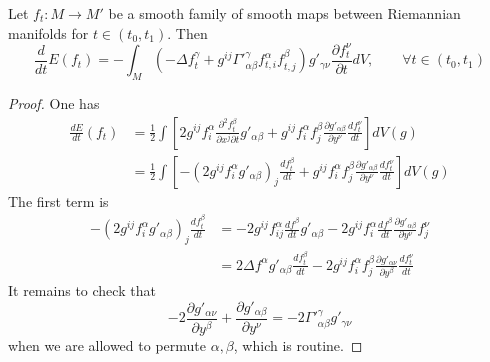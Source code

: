 \begin{lemma}
\label{lem:var-energy}
Let \(f_t: M \longrightarrow M'\) be a smooth family of smooth maps between Riemannian
manifolds for \(t\in (t_0,t_1)\). Then
\[
\frac{d}{dt}E(f_t) = -\int_M \left(-\Delta f_t^\gamma +g^{ij}\Gamma'^{\gamma}_{\alpha\beta}
f^{\alpha}_{t,i}f^{\beta}_{t,j}\right) g'_{\gamma\nu} \frac{\partial f_t^\nu}{\partial
t}dV,\qquad \forall t\in (t_0,t_1)
\]
\end{lemma}
\begin{proof}
One has 
\begin{align*}
   \frac{dE}{dt}(f_t) &= \frac{1}{2}\int \left[ 2g^{ij}  f^\alpha_i \frac{\partial^2 f_t^\beta}{\partial x^j
\partial t} g'_{\alpha\beta}   + g^{ij}f^\alpha_i f^\beta_j \frac{\partial g'_{\alpha\beta}}{\partial y^\nu} \frac{d f^\nu_t}{d t}  \right] dV(g) \\
	 &=\frac{1}{2}\int \left[ -\left(2g^{ij}  f^\alpha_i g'_{\alpha\beta}\right)_j \frac{d f_t^\beta}{
d t}   + g^{ij}f^\alpha_i f^\beta_j \frac{\partial g'_{\alpha\beta}}{\partial y^\nu} \frac{d f^\nu_t}{d t} \right] dV(g)
\end{align*}
The first term is
\begin{align*}
   -\left(2g^{ij}  f^\alpha_i g'_{\alpha\beta}\right)_j \frac{d f^\beta_t}{dt} &= -2 g^{ij}f^\alpha_{ij}
\frac{d f^\beta}{d t}g'_{\alpha\beta} - 2 g^{ij}f^\alpha_i
\frac{d f^\beta}{d t}\frac{\partial g'_{\alpha\beta}}{\partial y^\nu} f^\nu_j\\
&= 2\Delta f^\alpha g'_{\alpha\beta} \frac{d f_t^\beta}{d t} - 2 g^{ij}f^\alpha_i f^\beta_j \frac{\partial g'_{\alpha\nu}}{\partial y^\beta} \frac{d f_t^\nu}{dt}
\end{align*}
It remains to check that 
\[
-2\frac{\partial g'_{\alpha\nu}}{\partial y^\beta} + \frac{\partial
g'_{\alpha\beta}}{\partial y^\nu} = -2 \Gamma'^\gamma_{\alpha\beta}g'_{\gamma\nu}
\]
when we are allowed to permute \(\alpha,\beta\), which is routine.
\end{proof}

